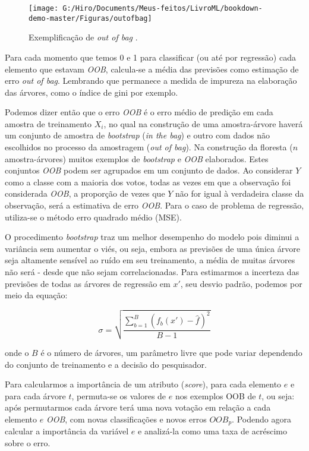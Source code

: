 \documentclass[
  openany]{book}
\begin{document}
\begin{figure}

{\centering \texttt{[image: G:/Hiro/Documents/Meus-feitos/LivroML/bookdown-demo-master/Figuras/outofbag]} 

}

\caption{Exemplificação de \emph{out of bag} \citep{machadousprf}.}\label{fig:outofbag}
\end{figure}



Para cada momento que temos 0 e 1 para classificar (ou até por regressão) cada elemento que estavam \emph{OOB}, calcula-se a média das previsões como estimação de erro \emph{out of bag}. Lembrando que permanece a medida de impureza na elaboração das árvores, como o índice de gini por exemplo.

Podemos dizer então que o erro \emph{OOB} é o erro médio de predição em cada amostra de treinamento \(X_i\), no qual na construção de uma amostra-árvore haverá um conjunto de amostra de \emph{bootstrap} (\emph{in the bag}) e outro com dados não escolhidos no processo da amostragem (\emph{out of bag}). Na construção da floresta (\(n\) amostra-árvores) muitos exemplos de \emph{bootstrap} e \emph{OOB} elaborados. Estes conjuntos \emph{OOB} podem ser agrupados em um conjunto de dados. Ao considerar \(Y\) como a classe com a maioria dos votos, todas as vezes em que a observação foi considerada \emph{OOB}, a proporção de vezes que \(Y\) não for igual à verdadeira classe da observação, será a estimativa de erro \emph{OOB}. Para o caso de problema de regressão, utiliza-se o método erro quadrado médio (MSE).

O procedimento \emph{bootstrap} traz um melhor desempenho do modelo pois diminui a variância sem aumentar o viés, ou seja, embora as previsões de uma única árvore seja altamente sensível ao ruído em seu treinamento, a média de muitas árvores não será - desde que não sejam correlacionadas. Para estimarmos a incerteza das previsões de todas as árvores de regressão em \(x'\), seu desvio padrão, podemos por meio da equação:

\begin{equation}
\sigma = \sqrt{\frac{\sum^B_{b=1}(f_b(x')-\hat{f})^2}{B-1}}
\label{eq:desviorf}
\end{equation}

onde o \(B\) é o número de árvores, um parâmetro livre que pode variar dependendo do conjunto de treinamento e a decisão do pesquisador.

Para calcularmos a importância de um atributo (\emph{score}), para cada elemento \(e\) e para cada árvore \(t\), permuta-se os valores de \(e\) nos exemplos OOB de \(t\), ou seja: após permutarmos cada árvore terá uma nova votação em relação a cada elemento \(e\) \emph{OOB}, com novas classificações e novos erros \(OOB_p\). Podendo agora calcular a importância da variável \(e\) e analizá-la como uma taxa de acréscimo sobre o erro.
\end{document}
